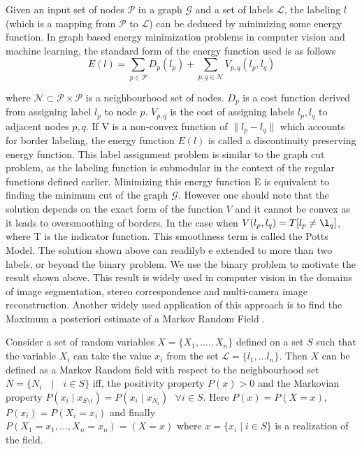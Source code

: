 Given an input set of nodes $\mathcal{P}$ in a graph $\mathcal{G}$ and a set of labels $\mathcal{L}$, the labeling $l$ (which is a mapping from $\mathcal{P}$ to $\mathcal{L}$) can be deduced by minimizing some energy function. In graph based energy minimization problems in computer vision and machine learning, the standard form of the energy function used is as follows
\[
E(l) = \underset{p\in\mathcal{P}}{\operatorname{\sum}} D_p(l_p) + \underset{p,q\in\mathcal{N}}{\operatorname{\sum}} V_{p,q}(l_p,l_q)
\]

where $\mathcal{N} \subset \mathcal{P}\times\mathcal{P}$ is a neighbourhood set of nodes. $D_p$ is a cost function derived from assigning label $l_p$ to node $p$. $V_{p,q}$ is the cost of assigning labels $l_p,l_q$ to adjacent nodes $p,q$. If V is a non-convex function of $\|l_p - l_q\|$ which accounts for border labeling, the energy function $E(l)$ is called a discontinuity preserving energy function. This label assignment problem is similar to the graph cut problem, as the labeling function is submodular in the context of the regular functions defined earlier. Minimizing this energy function E is equivalent to finding the minimum cut of the graph $\mathcal{G}$. However one should note that the solution depends on the exact form of the function $V$ and it cannot be convex as it leads to oversmoothing of borders. 
In the case when $V(l_p,l_q)=T[l_p\neq\l_q]$, where T is the indicator function. This smoothness term is called the Potts Model. The solution shown above can readilyb e extended to more than two labels, or beyond the binary problem. We use the binary problem to motivate the result shown above. This result is widely used in computer vision in the domains of image segmentation, stereo correspondence and multi-camera image reconstruction. Another widely used application of this approach is to find the Maximum a posteriori estimate of a Markov Random Field \cite{MRFKohli}.

Consider a set of random variables $X = \{X_1,....,X_n\}$ defined on a set $S$ such that the variable $X_i$ can take the value $x_i$ from the set $\mathcal{L} = \{l_1,...l_n\}$. Then $X$ can be defined as a Markov Random field with respect to the neighbourhood set $N = \{N_i \text{ } \mid \text{ } i\in S\}$ iff, the positivity property $P(x) > 0$ and the Markovian property $P(x_i\mid x_{S\setminus {i}}) = P(x_i \mid x_{N_i}) \text{ } \forall i \in S$. Here $P(x) = P(X = x)$, $P(x_i) = P(X_i = x_i)$ and finally $P(X_1 = x_1,...,X_n = x_n)  = (X = x) \text{ where } x = \{x_i \mid i\in S\}$ is a realization of the field. 

